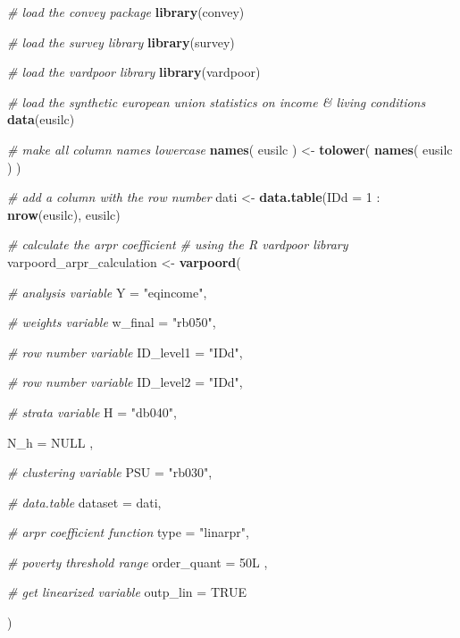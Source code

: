 \documentclass[]{book}
\newenvironment{Shaded}{\begin{snugshade}}{\end{snugshade}}
\newcommand{\KeywordTok}[1]{\textcolor[rgb]{0.13,0.29,0.53}{\textbf{{#1}}}}
\newcommand{\DataTypeTok}[1]{\textcolor[rgb]{0.13,0.29,0.53}{{#1}}}
\newcommand{\DecValTok}[1]{\textcolor[rgb]{0.00,0.00,0.81}{{#1}}}
\newcommand{\StringTok}[1]{\textcolor[rgb]{0.31,0.60,0.02}{{#1}}}
\newcommand{\CommentTok}[1]{\textcolor[rgb]{0.56,0.35,0.01}{\textit{{#1}}}}
\newcommand{\OtherTok}[1]{\textcolor[rgb]{0.56,0.35,0.01}{{#1}}}
\newcommand{\NormalTok}[1]{{#1}}
\begin{document}
\begin{Shaded}
\begin{Highlighting}[]
\CommentTok{# load the convey package}
\KeywordTok{library}\NormalTok{(convey)}

\CommentTok{# load the survey library}
\KeywordTok{library}\NormalTok{(survey)}

\CommentTok{# load the vardpoor library}
\KeywordTok{library}\NormalTok{(vardpoor)}

\CommentTok{# load the synthetic european union statistics on income & living conditions}
\KeywordTok{data}\NormalTok{(eusilc)}

\CommentTok{# make all column names lowercase}
\KeywordTok{names}\NormalTok{( eusilc ) <-}\StringTok{ }\KeywordTok{tolower}\NormalTok{( }\KeywordTok{names}\NormalTok{( eusilc ) )}

\CommentTok{# add a column with the row number}
\NormalTok{dati <-}\StringTok{ }\KeywordTok{data.table}\NormalTok{(}\DataTypeTok{IDd =} \DecValTok{1} \NormalTok{:}\StringTok{ }\KeywordTok{nrow}\NormalTok{(eusilc), eusilc)}

\CommentTok{# calculate the arpr coefficient}
\CommentTok{# using the R vardpoor library}
\NormalTok{varpoord_arpr_calculation <-}
\StringTok{    }\KeywordTok{varpoord}\NormalTok{(}
    
        \CommentTok{# analysis variable}
        \DataTypeTok{Y =} \StringTok{"eqincome"}\NormalTok{, }
        
        \CommentTok{# weights variable}
        \DataTypeTok{w_final =} \StringTok{"rb050"}\NormalTok{,}
        
        \CommentTok{# row number variable}
        \DataTypeTok{ID_level1 =} \StringTok{"IDd"}\NormalTok{,}
        
        \CommentTok{# row number variable}
        \DataTypeTok{ID_level2 =} \StringTok{"IDd"}\NormalTok{,}
        
        \CommentTok{# strata variable}
        \DataTypeTok{H =} \StringTok{"db040"}\NormalTok{, }
        
        \DataTypeTok{N_h =} \OtherTok{NULL} \NormalTok{,}
        
        \CommentTok{# clustering variable}
        \DataTypeTok{PSU =} \StringTok{"rb030"}\NormalTok{, }
        
        \CommentTok{# data.table}
        \DataTypeTok{dataset =} \NormalTok{dati, }
        
        \CommentTok{# arpr coefficient function}
        \DataTypeTok{type =} \StringTok{"linarpr"}\NormalTok{,}
      
      \CommentTok{# poverty threshold range}
      \DataTypeTok{order_quant =} \NormalTok{50L ,}
          
      \CommentTok{# get linearized variable}
      \DataTypeTok{outp_lin =} \OtherTok{TRUE}
        
    \NormalTok{)}
\end{Highlighting}
\end{Shaded}
\end{document}
